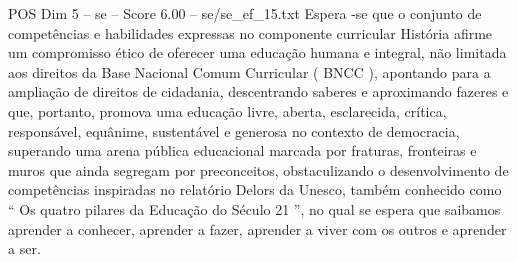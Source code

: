 \begin{textsample}{POS Dim 5 – se – Score 6.00 – se/se\_ef\_15.txt}
Espera -se que o conjunto de competências e habilidades expressas no componente curricular História afirme um compromisso ético de oferecer uma educação humana e integral, não limitada aos direitos da Base Nacional Comum Curricular ( BNCC ), apontando para a ampliação de direitos de cidadania, descentrando saberes e aproximando fazeres e que, portanto, promova uma educação livre, aberta, esclarecida, crítica, responsável, equânime, sustentável e generosa no contexto de democracia, superando uma arena pública educacional marcada por fraturas, fronteiras e muros que ainda segregam por preconceitos, obstaculizando o desenvolvimento de competências inspiradas no relatório Delors da Unesco, também conhecido como “ Os quatro pilares da Educação do Século 21 ”, no qual se espera que saibamos aprender a conhecer, aprender a fazer, aprender a viver com os outros e aprender a ser.

\end{textsample}

